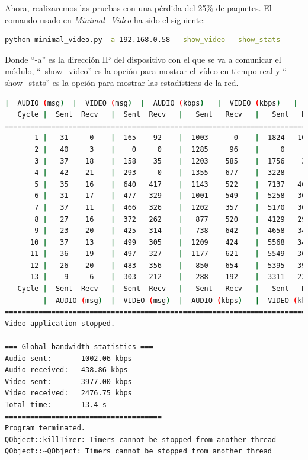 Ahora, realizaremos las pruebas con una pérdida del 25\% de paquetes. El comando usado en \textit{Minimal\_Video} ha sido el siguiente:

\begin{lstlisting}[language=bash]
python minimal_video.py -a 192.168.0.58 --show_video --show_stats
\end{lstlisting}
Donde ``-a'' es la dirección IP del dispositivo con el que se va a comunicar el módulo, ``--show\_video'' es la opción para mostrar el vídeo en tiempo real y ``--show\_stats'' es la opción para mostrar las estadísticas de la red.
\vspace{\baselineskip}

\begin{lstlisting}[language=bash,basicstyle=\ttfamily\tiny]
         |  AUDIO (msg)  |  VIDEO (msg)  |  AUDIO (kbps)   |  VIDEO (kbps)   |     CPU (%) 
   Cycle |  Sent  Recv   |  Sent  Recv   |   Sent   Recv   |   Sent   Recv   | Program System
================================================================================================
       1 |   31     0    |  165    92    |  1003      0    |  1824   1018    |  36     75       
       2 |   40     3    |    0     0    |  1285     96    |     0      0    |  47     76       
       3 |   37    18    |  158    35    |  1203    585    |  1756    387    |  51     77       
       4 |   42    21    |  293     0    |  1355    677    |  3228      0    |  42     68       
       5 |   35    16    |  640   417    |  1143    522    |  7137   4654    |  37     68       
       6 |   31    17    |  477   329    |  1001    549    |  5258   3627    |  34     67       
       7 |   37    11    |  466   326    |  1202    357    |  5170   3617    |  51     71       
       8 |   27    16    |  372   262    |   877    520    |  4129   2907    |  26     69       
       9 |   23    20    |  425   314    |   738    642    |  4658   3444    |  35     72       
      10 |   37    13    |  499   305    |  1209    424    |  5568   3403    |  38     72       
      11 |   36    19    |  497   327    |  1177    621    |  5549   3651    |  33     72       
      12 |   26    20    |  483   356    |   850    654    |  5395   3979    |  32     69       
      13 |    9     6    |  303   212    |   288    192    |  3311   2317    |  14     42       
   Cycle |  Sent  Recv   |  Sent  Recv   |   Sent   Recv   |   Sent   Recv   | Program System
         |  AUDIO (msg)  |  VIDEO (msg)  |  AUDIO (kbps)   |  VIDEO (kbps)   |     CPU (%) 
===========================================================================================
Video application stopped.

=== Global bandwidth statistics ===
Audio sent:       1002.06 kbps
Audio received:   438.86 kbps
Video sent:       3977.00 kbps
Video received:   2476.75 kbps
Total time:       13.4 s
=====================================
Program terminated.
QObject::killTimer: Timers cannot be stopped from another thread
QObject::~QObject: Timers cannot be stopped from another thread
\end{lstlisting}
\vspace{\baselineskip}

